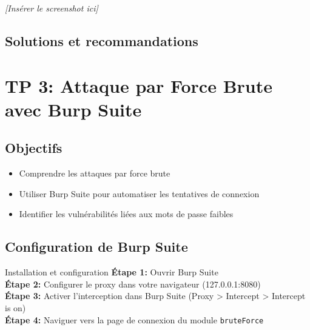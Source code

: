 \documentclass[12pt,a4paper]{article}
\begin{document}
\begin{screenshotbox}
\centering
\textit{[Insérer le screenshot ici]}
\end{screenshotbox}

\subsection{Solutions et recommandations}

\begin{answerbox}
\vspace{7cm}
\end{answerbox}

\newpage

\section{TP 3: Attaque par Force Brute avec Burp Suite}

\subsection{Objectifs}
\begin{itemize}
    \item Comprendre les attaques par force brute
    \item Utiliser Burp Suite pour automatiser les tentatives de connexion
    \item Identifier les vulnérabilités liées aux mots de passe faibles
\end{itemize}

\subsection{Configuration de Burp Suite}

\begin{exercicebox}{Installation et configuration}
\textbf{Étape 1:} Ouvrir Burp Suite\\
\textbf{Étape 2:} Configurer le proxy dans votre navigateur (127.0.0.1:8080)\\
\textbf{Étape 3:} Activer l'interception dans Burp Suite (Proxy > Intercept > Intercept is on)\\
\textbf{Étape 4:} Naviguer vers la page de connexion du module \texttt{bruteForce}
\end{exercicebox}
\end{document}
